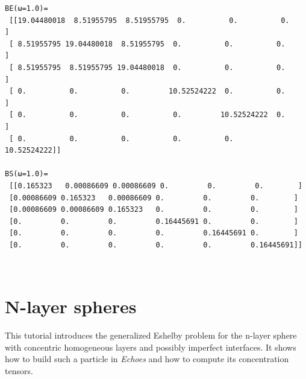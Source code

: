 \documentclass[
  a4paper,
  numbers=noendperiod,
  DIV=12]{scrreprt}
\begin{document}
\begin{verbatim}
BE(ω=1.0)=
 [[19.04480018  8.51955795  8.51955795  0.          0.          0.        ]
 [ 8.51955795 19.04480018  8.51955795  0.          0.          0.        ]
 [ 8.51955795  8.51955795 19.04480018  0.          0.          0.        ]
 [ 0.          0.          0.         10.52524222  0.          0.        ]
 [ 0.          0.          0.          0.         10.52524222  0.        ]
 [ 0.          0.          0.          0.          0.         10.52524222]] 

BS(ω=1.0)=
 [[0.165323   0.00086609 0.00086609 0.         0.         0.        ]
 [0.00086609 0.165323   0.00086609 0.         0.         0.        ]
 [0.00086609 0.00086609 0.165323   0.         0.         0.        ]
 [0.         0.         0.         0.16445691 0.         0.        ]
 [0.         0.         0.         0.         0.16445691 0.        ]
 [0.         0.         0.         0.         0.         0.16445691]] 
\end{verbatim}

\(\,\)

\chapter{N-layer spheres}\label{sec-nlayer_sphere}

\begin{tcolorbox}[enhanced jigsaw, arc=.35mm, bottomrule=.15mm, bottomtitle=1mm, breakable, colback=white, colbacktitle=quarto-callout-important-color!10!white, colframe=quarto-callout-important-color-frame, coltitle=black, left=2mm, leftrule=.75mm, opacityback=0, opacitybacktitle=0.6, rightrule=.15mm, title={Objectives}, titlerule=0mm, toprule=.15mm, toptitle=1mm]

This tutorial introduces the generalized Eshelby problem for the n-layer
sphere with concentric homogeneous layers and possibly imperfect
interfaces. It shows how to build such a particle in \emph{Echoes} and
how to compute its concentration tensors.

\end{tcolorbox}
\end{document}
